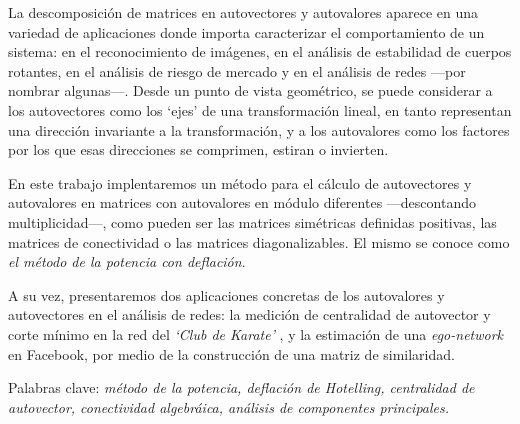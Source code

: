 La descomposición de matrices en autovectores y autovalores aparece en una variedad de aplicaciones donde importa caracterizar el comportamiento de un sistema: en el reconocimiento de imágenes, en el análisis de estabilidad de cuerpos rotantes, en el análisis de riesgo de mercado y en el análisis de redes ---por nombrar algunas---. Desde un punto de vista geométrico, se puede considerar a los autovectores como los `ejes' de una transformación lineal, en tanto representan una dirección invariante a la transformación, y a los autovalores como los factores por los que esas direcciones se comprimen, estiran o invierten. 

\vspace{1em}
En este trabajo implentaremos un método para el cálculo de autovectores y autovalores en matrices con autovalores en módulo diferentes ---descontando multiplicidad---, como pueden ser las matrices simétricas definidas positivas, las matrices de conectividad o las matrices diagonalizables. El mismo se conoce como \textit{el método de la potencia con deflación}. 

A su vez, presentaremos dos aplicaciones concretas de los autovalores y autovectores en el análisis de redes: la medición de centralidad de autovector y corte mínimo en la red del \textit{`Club de Karate'} , y la estimación de una \textit{ego-network}  en Facebook, por medio de la construcción de una matriz de similaridad.  

\vspace{1em}
\noindent Palabras clave: \textit{método de la potencia, deflación de Hotelling, centralidad de autovector, conectividad algebráica, análisis de componentes principales.}
